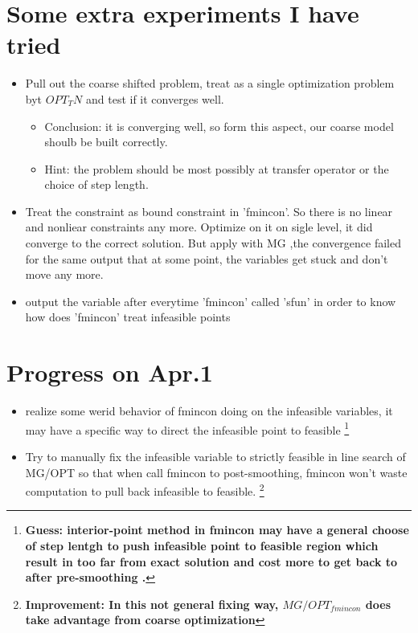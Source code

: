 \documentclass[10pt]{article}
\begin{document}
\section{Some extra experiments I have tried}
\begin{itemize}
\item Pull out the coarse shifted problem, treat as a single optimization problem byt $OPT_TN$ and test if it converges well.
\begin{itemize}
\item Conclusion: it is converging well, so form this aspect, our coarse model shoulb be built correctly. \\
\item Hint: the problem should be most possibly at transfer operator or the choice of step length.
\end{itemize}

\item Treat the constraint as bound constraint in 'fmincon'. So there is no linear and nonliear constraints any more. Optimize on it on sigle level, it did converge to the correct solution. But apply with MG ,the convergence failed for the same output that at some point, the variables get stuck and don't move any more.

\item output the variable after everytime 'fmincon' called 'sfun' in order to know how does 'fmincon' treat infeasible points
\end{itemize}


\section{Progress on Apr.1}
\begin{itemize}
\item realize some werid behavior of fmincon doing on the infeasible variables, it may have a specific way to direct the infeasible point to feasible \footnote {\bf Guess: interior-point method in fmincon may have a general choose of step lentgh to push infeasible point to feasible region which result in too far from exact solution and cost more to get back to after pre-smoothing .} \\
\item Try to manually fix the infeasible variable to strictly feasible in line search of MG/OPT so that when call fmincon to post-smoothing, fmincon won't waste computation to pull back infeasible to feasible. \footnote {\bf Improvement: In this not general fixing way, $MG/OPT_{fmincon}$ does take advantage from coarse optimization }\\
\end{itemize}
\end{document}
